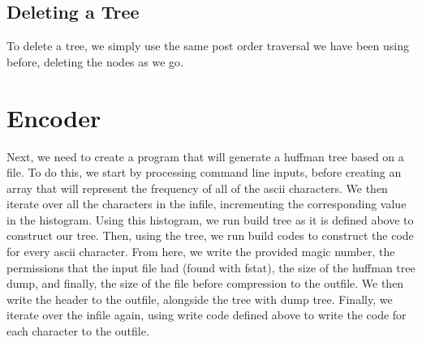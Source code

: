\documentclass[11pt]{article}
\begin{document}
\subsection{Deleting a Tree}

To delete a tree, we simply use the same post order traversal we have been using before, deleting the nodes as we go.

\section{Encoder}

Next, we need to create a program that will generate a huffman tree based on a file. To do this, we start by processing command line inputs, before creating an array that will represent the frequency of all of the ascii characters. We then iterate over all the characters in the infile, incrementing the corresponding value in the histogram. Using this histogram, we run build tree as it is defined above to construct our tree. Then, using the tree, we run build codes to construct the code for every ascii character. From here, we write the provided magic number, the permissions that the input file had (found with fstat), the size of the huffman tree dump, and finally, the size of the file before compression to the outfile. We then write the header to the outfile, alongside the tree with dump tree. Finally, we iterate over the infile again, using write code defined above to write the code for each character to the outfile.
\end{document}

